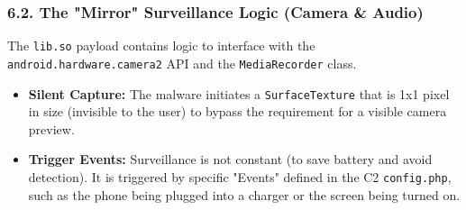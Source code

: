 \documentclass[
]{article}
\begin{document}
\subsubsection{\texorpdfstring{\textbf{6.2. The "Mirror" Surveillance
Logic (Camera \&
Audio)}}{6.2. The "Mirror" Surveillance Logic (Camera \& Audio)}}\label{62-the-mirror-surveillance-logic-camera--audio}

The \texttt{lib.so} payload contains logic to interface with the
\texttt{android.hardware.camera2} API and the \texttt{MediaRecorder}
class.

\begin{itemize}
\item
  \textbf{Silent Capture:} The malware initiates a
  \texttt{SurfaceTexture} that is 1x1 pixel in size (invisible to the
  user) to bypass the requirement for a visible camera preview.
\item
  \textbf{Trigger Events:} Surveillance is not constant (to save battery
  and avoid detection). It is triggered by specific "Events" defined in
  the C2 \texttt{config.php}, such as the phone being plugged into a
  charger or the screen being turned on.
\end{itemize}
\end{document}
